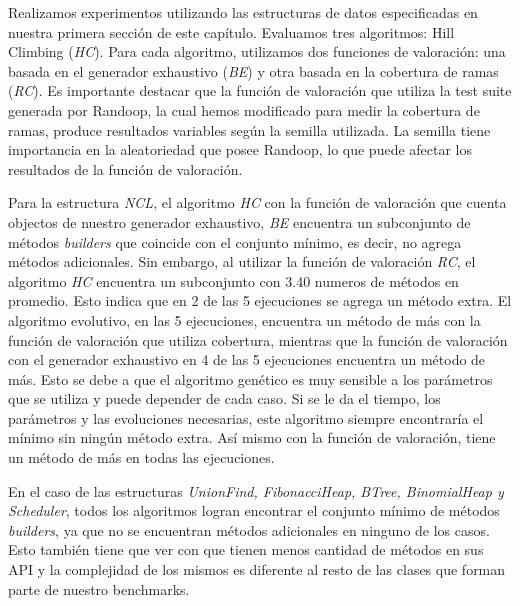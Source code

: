 Realizamos experimentos utilizando las estructuras de datos especificadas en nuestra primera sección de este capítulo. Evaluamos tres algoritmos: Hill Climbing (\emph{HC}). Para cada algoritmo, utilizamos dos funciones de valoración: una basada en el generador exhaustivo (\emph{BE}) y otra basada en la cobertura de ramas (\emph{RC}).
Es importante destacar que la función de valoración que utiliza la test suite generada por Randoop, la cual hemos modificado para medir la cobertura de ramas, produce resultados variables según la semilla utilizada. La semilla tiene importancia en la aleatoriedad que posee Randoop, lo que puede afectar los resultados de la función de valoración.

Para la estructura \emph{NCL}, el algoritmo \emph{HC} con la función de valoración que cuenta objectos de nuestro generador exhaustivo, \emph{BE} encuentra un subconjunto de métodos \emph{builders} que coincide con el conjunto mínimo, es decir, no agrega métodos adicionales. Sin embargo, al utilizar la función de valoración \emph{RC}, el algoritmo \emph{HC} encuentra un subconjunto con 3.40 numeros de métodos en promedio. Esto indica que en 2 de las 5 ejecuciones se agrega un método extra.
El algoritmo evolutivo, en las 5 ejecuciones, encuentra un método de más con la función de valoración que utiliza cobertura, mientras que la función de valoración con el generador exhaustivo en 4 de las 5 ejecuciones encuentra un método de más. Esto se debe a que el algoritmo genético es muy sensible a los parámetros que se utiliza y puede depender de cada caso. Si se le da el tiempo, los parámetros y las evoluciones necesarias, este algoritmo siempre encontraría el mínimo sin ningún método extra. Así mismo con la función de valoración, tiene un método de más en todas las ejecuciones.


En el caso de las estructuras \emph{UnionFind, FibonacciHeap, BTree, BinomialHeap y Scheduler}, todos los algoritmos logran encontrar el conjunto mínimo de métodos \emph{builders}, ya que no se encuentran métodos adicionales en ninguno de los casos. Esto también tiene que ver con que tienen menos cantidad de métodos en sus API y la complejidad de los mismos es diferente al resto de las clases que forman parte de nuestro benchmarks.

